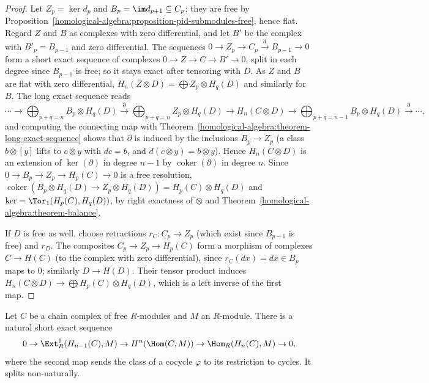 \begin{proof}
Let $Z_p = \ker d_p$ and $B_p = \im d_{p+1} \subseteq C_p$; they are free by
Proposition~\ref{homological-algebra:proposition-pid-submodules-free}, hence flat. Regard $Z$ and $B$ as complexes with zero
differential, and let $B'$ be the complex with $B'_p = B_{p-1}$ and zero differential. The sequences
$0 \to Z_p \to C_p \xrightarrow{d} B_{p-1} \to 0$ form a short exact sequence of complexes $0 \to Z \to C \to B' \to 0$, split in each degree
since $B_{p-1}$ is free; so it stays exact after tensoring with $D$. As $Z$ and $B$ are
flat with zero differential, $H_n(Z \otimes D) = \bigoplus Z_p \otimes H_q(D)$ and similarly for $B$. The long exact sequence reads
\[
\cdots \to \bigoplus_{p+q=n}B_p \otimes H_q(D) \xrightarrow{\partial} \bigoplus_{p+q=n}Z_p \otimes H_q(D) \to H_n(C \otimes D) \to
\bigoplus_{p+q=n-1}B_p \otimes H_q(D) \xrightarrow{\partial} \cdots,
\]
and computing the connecting map with Theorem~\ref{homological-algebra:theorem-long-exact-sequence} shows that $\partial$ is induced by
the inclusions $B_p \to Z_p$ (a class $b \otimes [y]$ lifts to $c \otimes y$ with $dc = b$, and $d(c \otimes y) = b \otimes y$). Hence
$H_n(C \otimes D)$ is an extension of $\ker(\partial)$ in degree $n - 1$ by $\operatorname{coker}(\partial)$ in degree $n$. Since
$0 \to B_p \to Z_p \to H_p(C) \to 0$ is a free resolution, $\operatorname{coker}(B_p \otimes H_q(D) \to Z_p \otimes H_q(D)) = H_p(C) \otimes H_q(D)$ and
$\ker = \Tor_1(H_p(C), H_q(D))$, by right exactness of $\otimes$ and Theorem~\ref{homological-algebra:theorem-balance}.

If $D$ is free as well, choose retractions $r_C \colon C_p \to Z_p$ (which exist since $B_{p-1}$ is free) and $r_D$. The composites
$C_p \to Z_p \to H_p(C)$ form a morphism of complexes $C \to H(C)$ (to the complex with zero differential), since $r_C(dx) = dx \in B_p$
maps to $0$; similarly $D \to H(D)$. Their tensor product induces $H_n(C \otimes D) \to \bigoplus H_p(C) \otimes H_q(D)$, which is a left
inverse of the first map.
\end{proof}

\begin{theorem}\label{homological-algebra:theorem-universal-coefficients}
Let $C$ be a chain complex of free $R$-modules and $M$ an $R$-module. There is a natural short exact sequence
\[
0 \to \Ext^1_R(H_{n-1}(C), M) \to H^n(\Hom(C, M)) \to \Hom_R(H_n(C), M) \to 0,
\]
where the second map sends the class of a cocycle $\varphi$ to its restriction to cycles. It splits non-naturally.
\end{theorem}

